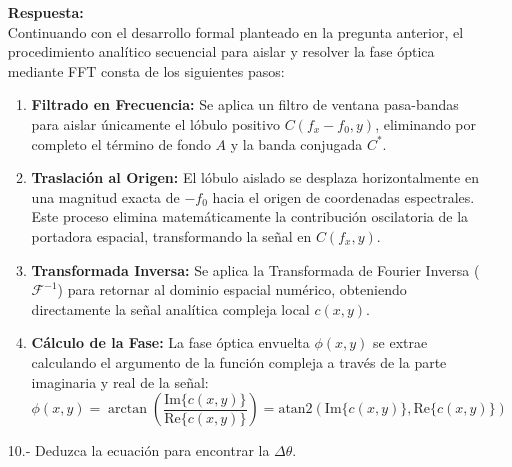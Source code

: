 \documentclass[12pt,letterpaper]{article}
\begin{document}
\begin{enumerate}
		\vspace{0.3cm}
		\textbf{Respuesta:} \\
		Continuando con el desarrollo formal planteado en la pregunta anterior, el procedimiento analítico secuencial para aislar y resolver la fase óptica mediante FFT consta de los siguientes pasos:
		\begin{enumerate}
			\item \textbf{Filtrado en Frecuencia:} Se aplica un filtro de ventana pasa-bandas para aislar únicamente el lóbulo positivo $C(f_x - f_0, y)$, eliminando por completo el término de fondo $A$ y la banda conjugada $C^*$.
			\item \textbf{Traslación al Origen:} El lóbulo aislado se desplaza horizontalmente en una magnitud exacta de $-f_0$ hacia el origen de coordenadas espectrales. Este proceso elimina matemáticamente la contribución oscilatoria de la portadora espacial, transformando la señal en $C(f_x, y)$.
			\item \textbf{Transformada Inversa:} Se aplica la Transformada de Fourier Inversa ($\mathcal{F}^{-1}$) para retornar al dominio espacial numérico, obteniendo directamente la señal analítica compleja local $c(x,y)$.
			\item \textbf{Cálculo de la Fase:} La fase óptica envuelta $\phi(x,y)$ se extrae calculando el argumento de la función compleja a través de la parte imaginaria y real de la señal:
			\[ \phi(x,y) = \arctan\left( \frac{\text{Im}\{c(x,y)\}}{\text{Re}\{c(x,y)\}} \right) = \text{atan2}(\text{Im}\{c(x,y)\}, \text{Re}\{c(x,y)\}) \]
		\end{enumerate}
		\vspace{0.5cm}
		
		\item[10.-] Deduzca la ecuación para encontrar la $\Delta\theta$.
		

\end{enumerate}
\end{document}
